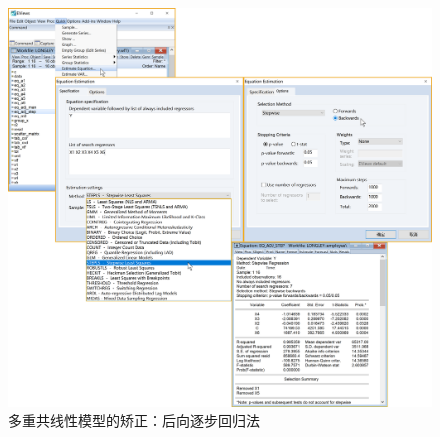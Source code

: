\documentclass[12pt,(landscape,a4paper),(portrait,a4paper)]{article}
\begin{document}
\begin{figure}

{\centering \includegraphics[width=8in]{picture/lab5-multilinearity/5-medel-adj-step-show} 

}

\caption{多重共线性模型的矫正：后向逐步回归法}\label{fig:fig-adj-step}
\end{figure}
\end{document}
